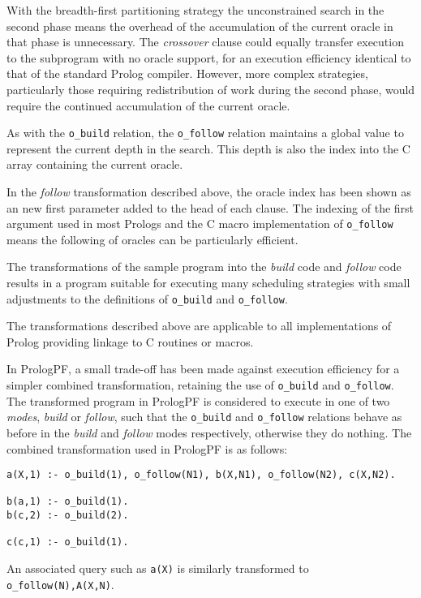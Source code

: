With the breadth-first partitioning strategy the unconstrained search in the
second phase means the overhead of the accumulation of the current oracle in
that phase is unnecessary.  The \textit{crossover} clause could equally
transfer execution to the subprogram with no oracle support, for an
execution efficiency identical to that of the standard Prolog compiler.
However, more complex strategies, particularly those requiring
redistribution of work during the second phase, would require the continued
accumulation of the current oracle.

As with the \texttt{o\_{}build} relation, the \texttt{o\_{}follow} relation maintains a global value
to represent the current depth in the search.  This depth is also the index into the C array 
containing the current oracle.

In the \textit{follow} transformation described above, the oracle index has been shown as an 
new first parameter added to the head of each clause.  The indexing of the first argument used in
most Prologs and the C macro implementation of \texttt{o\_{}follow} means the following of oracles
can be particularly efficient.

The transformations of the sample program into the \textit{build} code and \textit{follow} code
results in a program suitable for executing many scheduling strategies with small adjustments to
the definitions of \texttt{o\_{}build} and \texttt{o\_{}follow}.

The transformations described above are applicable to all implementations of Prolog providing
linkage to C routines or macros.

In PrologPF, a small trade-off has been made against execution efficiency for a simpler combined
transformation, retaining the use of \texttt{o\_{}build} and \texttt{o\_{}follow}.  The transformed
program in PrologPF is considered to execute in one of two \textit{modes}, \textit{build} or
\textit{follow}, such that the \texttt{o\_{}build} and \texttt{o\_{}follow} relations behave as
before in the \textit{build} and \textit{follow} modes respectively, otherwise they do nothing.
The combined transformation used in PrologPF is as follows:
\begin{verbatim}
a(X,1) :- o_build(1), o_follow(N1), b(X,N1), o_follow(N2), c(X,N2).

b(a,1) :- o_build(1).
b(c,2) :- o_build(2).

c(c,1) :- o_build(1).
\end{verbatim}

An associated query such as \texttt{a(X)} is similarly transformed to \texttt{o\_{}follow(N),A(X,N)}.

